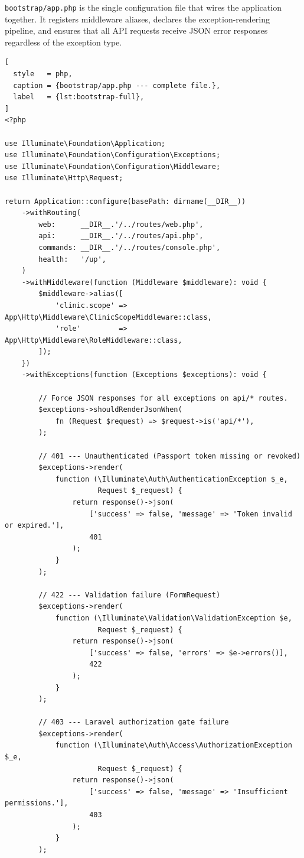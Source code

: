 \texttt{bootstrap/app.php} is the single configuration file that wires
the application together. It registers middleware aliases, declares the
exception-rendering pipeline, and ensures that all API requests receive
JSON error responses regardless of the exception type.

\begin{lstlisting}[
  style   = php,
  caption = {bootstrap/app.php --- complete file.},
  label   = {lst:bootstrap-full},
]
<?php

use Illuminate\Foundation\Application;
use Illuminate\Foundation\Configuration\Exceptions;
use Illuminate\Foundation\Configuration\Middleware;
use Illuminate\Http\Request;

return Application::configure(basePath: dirname(__DIR__))
    ->withRouting(
        web:      __DIR__.'/../routes/web.php',
        api:      __DIR__.'/../routes/api.php',
        commands: __DIR__.'/../routes/console.php',
        health:   '/up',
    )
    ->withMiddleware(function (Middleware $middleware): void {
        $middleware->alias([
            'clinic.scope' => App\Http\Middleware\ClinicScopeMiddleware::class,
            'role'         => App\Http\Middleware\RoleMiddleware::class,
        ]);
    })
    ->withExceptions(function (Exceptions $exceptions): void {

        // Force JSON responses for all exceptions on api/* routes.
        $exceptions->shouldRenderJsonWhen(
            fn (Request $request) => $request->is('api/*'),
        );

        // 401 --- Unauthenticated (Passport token missing or revoked)
        $exceptions->render(
            function (\Illuminate\Auth\AuthenticationException $_e,
                      Request $_request) {
                return response()->json(
                    ['success' => false, 'message' => 'Token invalid or expired.'],
                    401
                );
            }
        );

        // 422 --- Validation failure (FormRequest)
        $exceptions->render(
            function (\Illuminate\Validation\ValidationException $e,
                      Request $_request) {
                return response()->json(
                    ['success' => false, 'errors' => $e->errors()],
                    422
                );
            }
        );

        // 403 --- Laravel authorization gate failure
        $exceptions->render(
            function (\Illuminate\Auth\Access\AuthorizationException $_e,
                      Request $_request) {
                return response()->json(
                    ['success' => false, 'message' => 'Insufficient permissions.'],
                    403
                );
            }
        );


\end{lstlisting}
